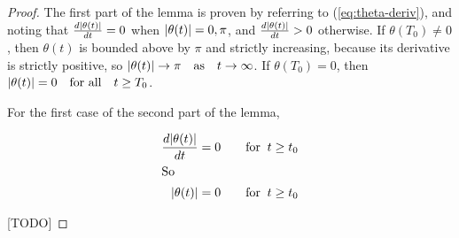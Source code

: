 \begin{proof}

The first part of the lemma is proven by referring to (\ref{eq:theta-deriv}), and noting that $\frac{d\abs{\theta(t)}}{dt} = 0$ when $\abs{\theta(t)} = 0, \pi$, and $\frac{d\abs{\theta(t)}}{dt} > 0$ otherwise. If $\theta(T_0) \ne 0$, then $\theta(t)$ is bounded above by $\pi$ and strictly increasing, because its derivative is strictly positive, so $\abs{\theta(t)} \to \pi \quad \text{as} \quad t \to \infty$. If $\theta(T_0) = 0$, then $\abs{\theta(t)} = 0 \quad \text{for all} \quad t \ge T_0$.

For the first case of the second part of the lemma, 

\begin{align*}
\frac{d\abs{\theta(t)}}{dt} = 0 \qquad \text{for} \;\; t \ge t_0\\
\intertext{So}
\abs{\theta(t)} = 0 \qquad \text{for} \;\; t \ge t_0
\end{align*}

[TODO]

\end{proof}
